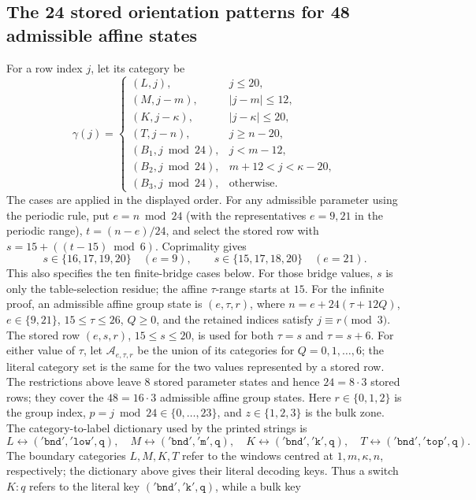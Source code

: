 \subsection{The 24 stored orientation patterns for 48 admissible affine states}\label{sec:orientation-data}
For a row index \(j\), let its category be
\[
\gamma(j)=\begin{cases}
(L,j),&j\le20,\\
(M,j-m),&|j-m|\le12,\\
(K,j-\kappa),&|j-\kappa|\le20,\\
(T,j-n),&j\ge n-20,\\
(B_1,j\bmod24),&j<m-12,\\
(B_2,j\bmod24),&m+12<j<\kappa-20,\\
(B_3,j\bmod24),&\text{otherwise}.
\end{cases}
\]
The cases are applied in the displayed order.  For any admissible parameter using the periodic rule,
put \(e=n\bmod24\) (with the representatives \(e=9,21\) in the periodic range),
\(t=(n-e)/24\), and select the stored row with
\(s=15+((t-15)\bmod6)\).  Coprimality gives
\[
s\in\{16,17,19,20\}\quad(e=9),\qquad
s\in\{15,17,18,20\}\quad(e=21).
\]
This also specifies the ten finite-bridge cases below.  For those bridge values, \(s\) is only
the table-selection residue; the affine \(\tau\)-range starts at \(15\).  For the infinite proof, an admissible affine
group state is \((e,\tau,r)\), where
\(n=e+24(\tau+12Q)\), \(e\in\{9,21\}\), \(15\le\tau\le26\), \(Q\ge0\), and
the retained indices satisfy \(j\equiv r\pmod3\).  The stored row \((e,s,r)\),
\(15\le s\le20\), is used for both \(\tau=s\) and \(\tau=s+6\).  For either value of
\(\tau\), let \(\mathcal A_{e,\tau,r}\) be the union of its categories for \(Q=0,1,\ldots,6\);
the literal category set is the same for the two values represented by a stored row.
The restrictions above leave $8$ stored parameter states and hence $24=8\cdot3$ stored rows; they
cover the $48=16\cdot3$ admissible affine group states.  Here \(r\in\{0,1,2\}\) is the group
index, \(p=j\bmod24\in\{0,\ldots,23\}\), and \(z\in\{1,2,3\}\) is the bulk zone.  The
category-to-label dictionary used by the printed strings is
\[
L\longleftrightarrow\mathtt{('bnd','low',q)},\quad
M\longleftrightarrow\mathtt{('bnd','m',q)},\quad
K\longleftrightarrow\mathtt{('bnd','k',q)},\quad
T\longleftrightarrow\mathtt{('bnd','top',q)}.
\]
The boundary categories \(L,M,K,T\) refer to the windows centred at \(1,m,\kappa,n\),
respectively; the dictionary above gives their literal decoding keys.
Thus a switch \(K:q\) refers to the literal key \(\mathtt{('bnd','k',q)}\), while a bulk key
